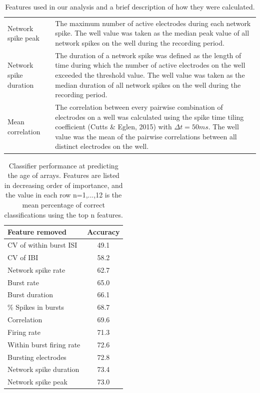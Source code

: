 \documentclass{article}
\begin{document}
\begin{table}
\begin{tabular}{|l|m{11cm}|}
  		\\ Network spike peak & The maximum number of active electrodes during each network spike. The well value was taken as the median peak value of all network spikes on the well during the recording period.
  		\\ Network spike duration & The duration of a network spike was defined as the length of time during which the  number of active electrodes on the well exceeded the threshold value. The well value was taken as the median duration of all network spikes on the well during the recording period.
  		\\ Mean correlation & The correlation between every pairwise combination of electrodes on a well was calculated using the spike time tiling coefficient (Cutts \& Eglen, 2015) with $\Delta t = 50ms$. The well value was the mean of the pairwise correlations between all distinct electrodes on the well.
  		\\ \hline
  	\end{tabular}
  \caption{Features used in our analysis and a brief description of how
    they were calculated.}
\end{table}

\begin{table}
  \centering
  \begin{tabular}{|l|c|}
  	\hline
  	\textbf{Feature removed} & \textbf{Accuracy}
  	\\ \hline 
  	CV of within burst ISI & 49.1
  	\\CV of IBI & 58.2
  	\\ Network spike rate& 62.7
  	\\ Burst rate & 65.0
  	\\ Burst duration& 66.1
  	\\ \% Spikes in bursts & 68.7
  	\\Correlation & 69.6
  	\\Firing rate & 71.3
  	\\Within burst firing rate & 72.6
  	\\Bursting electrodes & 72.8
  	\\ Network spike duration & 73.4
  	\\Network spike peak & 73.0
  	\\ \hline
  \end{tabular}
  \caption{Classifier performance at predicting the age of
arrays. Features are listed in decreasing order of importance, and the
value in each row n=1,...,12 is the mean percentage of correct
classifications using the top n features.}
\end{table}
\end{document}
